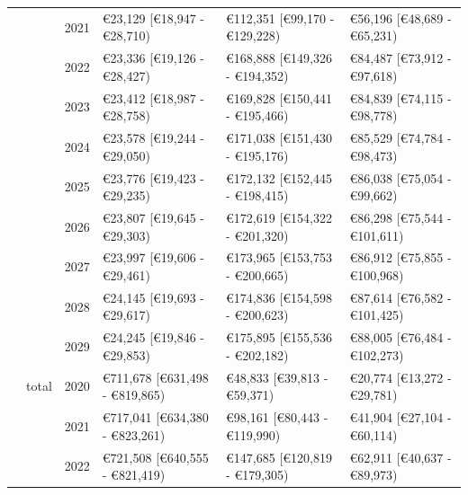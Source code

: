 \documentclass[
]{article}
\begin{document}
\begin{landscape}
\begin{longtable}[t]{llrlll}
\cmidrule{3-6}\nopagebreak
\hspace{1em} &  & 2021 & €23,129 [€18,947 - €28,710) & €112,351 [€99,170 - €129,228) & €56,196 [€48,689 - €65,231)\\
\cmidrule{3-6}\nopagebreak
\hspace{1em} &  & 2022 & €23,336 [€19,126 - €28,427) & €168,888 [€149,326 - €194,352) & €84,487 [€73,912 - €97,618)\\
\cmidrule{3-6}\nopagebreak
\hspace{1em} &  & 2023 & €23,412 [€18,987 - €28,758) & €169,828 [€150,441 - €195,466) & €84,839 [€74,115 - €98,778)\\
\cmidrule{3-6}\nopagebreak
\hspace{1em} &  & 2024 & €23,578 [€19,244 - €29,050) & €171,038 [€151,430 - €195,176) & €85,529 [€74,784 - €98,473)\\
\cmidrule{3-6}\nopagebreak
\hspace{1em} &  & 2025 & €23,776 [€19,423 - €29,235) & €172,132 [€152,445 - €198,415) & €86,038 [€75,054 - €99,662)\\
\cmidrule{3-6}\nopagebreak
\hspace{1em} &  & 2026 & €23,807 [€19,645 - €29,303) & €172,619 [€154,322 - €201,320) & €86,298 [€75,544 - €101,611)\\
\cmidrule{3-6}\nopagebreak
\hspace{1em} &  & 2027 & €23,997 [€19,606 - €29,461) & €173,965 [€153,753 - €200,665) & €86,912 [€75,855 - €100,968)\\
\cmidrule{3-6}\nopagebreak
\hspace{1em} &  & 2028 & €24,145 [€19,693 - €29,617) & €174,836 [€154,598 - €200,623) & €87,614 [€76,582 - €101,425)\\
\cmidrule{3-6}\nopagebreak
\hspace{1em} &  & 2029 & €24,245 [€19,846 - €29,853) & €175,895 [€155,536 - €202,182) & €88,005 [€76,484 - €102,273)\\
\cmidrule{2-6}\nopagebreak
\hspace{1em} & total & 2020 & €711,678 [€631,498 - €819,865) & €48,833 [€39,813 - €59,371) & €20,774 [€13,272 - €29,781)\\
\cmidrule{3-6}\nopagebreak
\hspace{1em} &  & 2021 & €717,041 [€634,380 - €823,261) & €98,161 [€80,443 - €119,990) & €41,904 [€27,104 - €60,114)\\
\cmidrule{3-6}\nopagebreak
\hspace{1em} &  & 2022 & €721,508 [€640,555 - €821,419) & €147,685 [€120,819 - €179,305) & €62,911 [€40,637 - €89,973)\\

\end{longtable}
\end{landscape}
\end{document}
